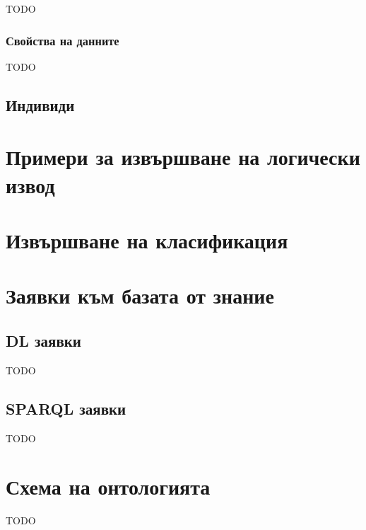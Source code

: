 \documentclass[12pt]{article}
\begin{document}
    TODO
    
    \subsubsection{Свойства на данните}
    
    TODO
    
    
    
    
    \subsection{Индивиди}
    
    
    
    
    

\section{Примери за извършване на логически извод}








\section{Извършване на класификация}






\section{Заявки към базата от знание}

\subsection{DL заявки}

TODO

\subsection{SPARQL заявки}

TODO







\section{Схема на онтологията}

TODO
\end{document}
